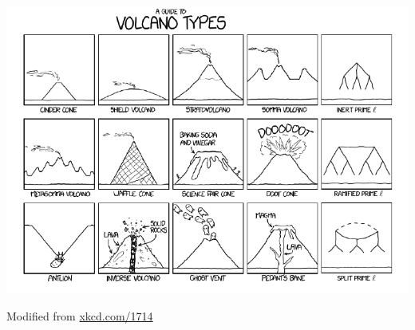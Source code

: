\documentclass[10pt,a4paper]{beamer}
\theoremstyle{plain}
\theoremstyle{definition}
\theoremstyle{definition}
\theoremstyle{definition}
\theoremstyle{definition}
\theoremstyle{remark}
\theoremstyle{remark}
\begin{document}


% 

\begin{frame}
\begin{center}
\includegraphics[width=.9\hsize]{Images/volcan}
\end{center}
Modified from  \href{http://xkcd.com/1714/}{xkcd.com/1714}
\end{frame}
\end{document}
